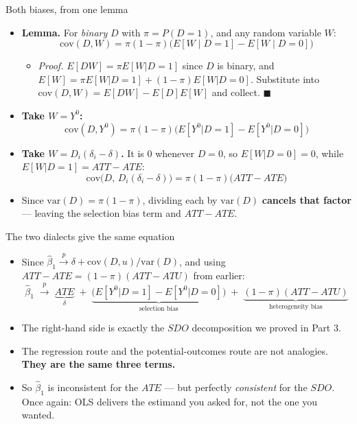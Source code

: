 \documentclass[
  11pt,
  ignorenonframetext,
  aspectratio=169,
]{beamer}
\providecommand{\tightlist}{%
  \setlength{\itemsep}{0pt}\setlength{\parskip}{0pt}}
\begin{document}
\begin{frame}{Both biases, from one lemma}
\protect{}\label{both-biases-from-one-lemma}
\small

\begin{itemize}
\tightlist
\item
  \textbf{Lemma.} For \emph{binary} \(D\) with \(\pi = P(D{=}1)\), and
  any random variable \(W\): \[
  \mathrm{cov}(D, W) = \pi(1-\pi)\Big(E[W \mid D{=}1] - E[W \mid D{=}0]\Big)
  \]

  \begin{itemize}
  \tightlist
  \item
    \emph{Proof.} \(E[DW] = \pi E[W|D{=}1]\) since \(D\) is binary, and
    \(E[W] = \pi E[W|D{=}1] + (1-\pi)E[W|D{=}0]\). Substitute into
    \(\mathrm{cov}(D,W) = E[DW] - E[D]E[W]\) and collect.
    \(\blacksquare\)
  \end{itemize}
\item
  \textbf{Take \(W = Y^0\):} \[
  \mathrm{cov}(D, Y^0) = \pi(1-\pi)\Big(E[Y^0|D{=}1] - E[Y^0|D{=}0]\Big)
  \]
\item
  \textbf{Take \(W = D_i(\delta_i - \delta)\).} It is \(0\) whenever
  \(D=0\), so \(E[W|D{=}0] = 0\), while \(E[W|D{=}1] = ATT - ATE\): \[
  \mathrm{cov}\big(D,\, D_i(\delta_i-\delta)\big) = \pi(1-\pi)\big(ATT - ATE\big)
  \]
\item
  Since \(\mathrm{var}(D) = \pi(1-\pi)\), dividing each by
  \(\mathrm{var}(D)\) \textbf{cancels that factor} --- leaving the
  selection bias term and \(ATT - ATE\). \normalsize
\end{itemize}
\end{frame}

\begin{frame}{The two dialects give the same equation}
\protect{}\label{the-two-dialects-give-the-same-equation}
\begin{itemize}
\tightlist
\item
  Since
  \(\hat\beta_1 \xrightarrow{p} \delta + \mathrm{cov}(D,u)/\mathrm{var}(D)\),
  and using \(ATT - ATE = (1-\pi)(ATT-ATU)\) from earlier: \[
  \hat\beta_1 \;\xrightarrow{p}\;
  \underbrace{ATE}_{\delta}
  \;+\; \underbrace{\Big(E[Y^0|D{=}1]-E[Y^0|D{=}0]\Big)}_{\text{selection bias}}
  \;+\; \underbrace{(1-\pi)(ATT-ATU)}_{\text{heterogeneity bias}}
  \]
\item
  The right-hand side is exactly the \(SDO\) decomposition we proved in
  Part 3.
\item
  The regression route and the potential-outcomes route are not
  analogies. \textbf{They are the same three terms.}
\item
  So \(\hat\beta_1\) is inconsistent for the \(ATE\) --- but perfectly
  \emph{consistent} for the \(SDO\). Once again: OLS delivers the
  estimand you asked for, not the one you wanted.
\end{itemize}
\end{frame}
\end{document}
